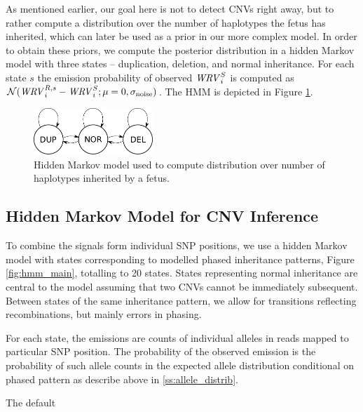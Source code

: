 As mentioned earlier, our goal here is not to detect CNVs right away, but to rather compute a distribution over the number of haplotypes the fetus has inherited, which can later be used as a prior in our more complex model. In order to obtain these priors, we compute the posterior distribution in a hidden Markov model with three states -- duplication, deletion, and normal inheritance. For each state $s$ the emission probability of observed $\mathit{WRV}_i^S$ is computed as $\mathcal{N}(\mathit{WRV}_i^{R,s}-\mathit{WRV}_i^S; \mu=0, \sigma_{\text{noise}})$. The HMM is depicted in Figure \ref{fig:hmm_coverage}.

\begin{figure}[h]
\center\includegraphics[width = 0.4\textwidth]{figures/cov-HMM}
\caption{Hidden Markov model used to compute distribution over number of haplotypes inherited by a fetus.}\label{fig:hmm_coverage}
\end{figure}

\subsection{Hidden Markov Model for CNV Inference}\label{ss:hmm}
To combine the signals form individual SNP positions, we use a hidden Markov model with states corresponding to modelled phased inheritance patterns, Figure \ref{fig:hmm_main}, totalling to 20 states. States representing normal inheritance are central to the model assuming that two CNVs cannot be immediately subsequent. Between states of the same inheritance pattern, we allow for transitions reflecting recombinations, but mainly errors in phasing.

For each state, the emissions are counts of individual alleles in reads mapped to particular SNP position. The probability of the observed emission is the probability of such allele counts in the expected allele distribution conditional on phased pattern as describe above in \ref{ss:allele_distrib}.

The default 


